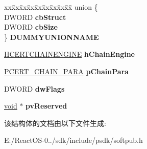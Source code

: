 \begin{DoxyCompactItemize}
\item 
\mbox{\label{struct___w_t_d___g_e_n_e_r_i_c___c_h_a_i_n___p_o_l_i_c_y___c_r_e_a_t_e___i_n_f_o_a2bd6512834baaaf688c8dee0efaf780c}} 
\begin{tabbing}
xx\=xx\=xx\=xx\=xx\=xx\=xx\=xx\=xx\=\kill
union \{\\
\>DWORD {\bfseries cbStruct}\\
\>DWORD {\bfseries cbSize}\\
\} {\bfseries DUMMYUNIONNAME}\\

\end{tabbing}\item 
\mbox{\label{struct___w_t_d___g_e_n_e_r_i_c___c_h_a_i_n___p_o_l_i_c_y___c_r_e_a_t_e___i_n_f_o_a835dc05826b2df435ddfee8fbf86fe68}} 
\hyperlink{interfacevoid}{H\+C\+E\+R\+T\+C\+H\+A\+I\+N\+E\+N\+G\+I\+NE} {\bfseries h\+Chain\+Engine}
\item 
\mbox{\label{struct___w_t_d___g_e_n_e_r_i_c___c_h_a_i_n___p_o_l_i_c_y___c_r_e_a_t_e___i_n_f_o_a2cc0a4098280333681847b68ca26fbd2}} 
\hyperlink{struct___c_e_r_t___c_h_a_i_n___p_a_r_a}{P\+C\+E\+R\+T\+\_\+\+C\+H\+A\+I\+N\+\_\+\+P\+A\+RA} {\bfseries p\+Chain\+Para}
\item 
\mbox{\label{struct___w_t_d___g_e_n_e_r_i_c___c_h_a_i_n___p_o_l_i_c_y___c_r_e_a_t_e___i_n_f_o_abc075034fbab62168174981a681ac7a0}} 
D\+W\+O\+RD {\bfseries dw\+Flags}
\item 
\mbox{\label{struct___w_t_d___g_e_n_e_r_i_c___c_h_a_i_n___p_o_l_i_c_y___c_r_e_a_t_e___i_n_f_o_a3f20002c4701878393941c3ece66539b}} 
\hyperlink{interfacevoid}{void} $\ast$ {\bfseries pv\+Reserved}
\end{DoxyCompactItemize}


该结构体的文档由以下文件生成\+:\begin{DoxyCompactItemize}
\item 
E\+:/\+React\+O\+S-\/0../sdk/include/psdk/softpub.\+h\end{DoxyCompactItemize}
